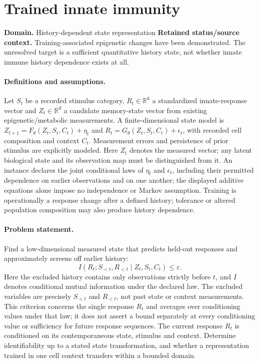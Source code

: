 \documentclass[11pt]{article}
\begin{document}
\section*{Trained innate immunity}
\label{prob:237}
\label{rank:178}
\par\smallskip

\noindent\textbf{Domain.} History-dependent state representation \quad \textbf{Retained status/source context.} Training-associated epigenetic changes have been demonstrated. The unresolved target is a sufficient quantitative history state, not whether innate immune history dependence exists at all.
\paragraph{Definitions and assumptions.} Let $S_t$ be a recorded stimulus category, $R_t\in\mathbb{R}^k$ a standardized innate-response vector and $Z_t\in\mathbb{R}^d$ a candidate memory-state vector from existing epigenetic/metabolic measurements. A finite-dimensional state model is $Z_{t+1}=F_\theta(Z_t,S_t,C_t)+\eta_t$ and $R_t=G_\theta(Z_t,S_t,C_t)+\epsilon_t$, with recorded cell composition and context $C_t$. Measurement errors and persistence of prior stimulus are explicitly modeled. Here $Z_t$ denotes the measured vector; any latent biological state and its observation map must be distinguished from it. An instance declares the joint conditional laws of $\eta_t$ and $\epsilon_t$, including their permitted dependence on earlier observations and on one another; the displayed additive equations alone impose no independence or Markov assumption. Training is operationally a response change after a defined history; tolerance or altered population composition may also produce history dependence.
\paragraph{Problem statement.} Find a low-dimensional measured state that predicts held-out responses and approximately screens off earlier history:
\[I(R_t;S_{<t},R_{<t}\mid Z_t,S_t,C_t)\leq\varepsilon.\]
Here the excluded history contains only observations strictly before $t$, and $I$ denotes conditional mutual information under the declared law. The excluded variables are precisely $S_{<t}$ and $R_{<t}$, not past state or context measurements. This criterion concerns the single response $R_t$ and averages over conditioning values under that law; it does not assert a bound separately at every conditioning value or sufficiency for future response sequences. The current response $R_t$ is conditioned on its contemporaneous state, stimulus and context. Determine identifiability up to a stated state transformation, and whether a representation trained in one cell context transfers within a bounded domain.
\end{document}
